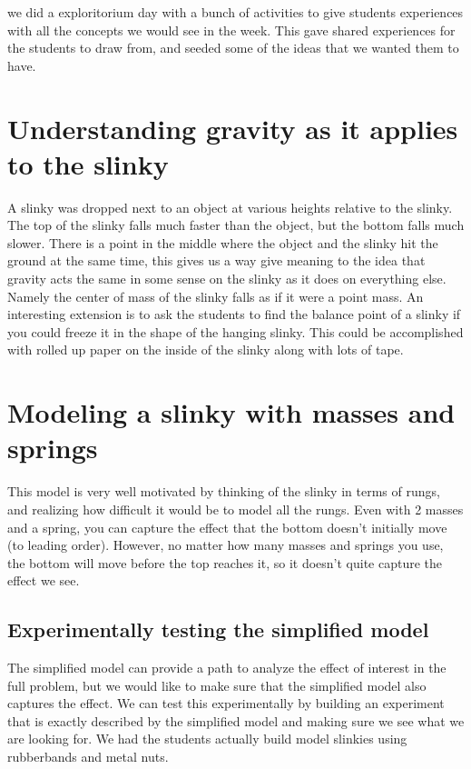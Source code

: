 \documentclass[aps,pre,10pt,superscriptaddress,showpacs,amsmath,amssymb,nofootinbib]{revtex4-1}
\begin{document}
we did a exploritorium day with a bunch of activities to give students experiences with all the concepts we would see in the week.  This gave shared experiences for the students to draw from, and seeded some of the ideas that we wanted them to have.

\section{Understanding gravity as it applies to the slinky}
A slinky was dropped next to an object at various heights relative to the slinky.  The top of the slinky falls much faster than the object, but the bottom falls much slower.  There is a point in the middle where the object and the slinky hit the ground at the same time, this gives us a way give meaning to the idea that gravity acts the same in some sense on the slinky as it does on everything else. Namely the center of mass of the slinky falls as if it were a point mass. An interesting extension is to ask the students to find the balance point of a slinky if you could freeze it in the shape of the hanging slinky.  This could be accomplished with rolled up paper on the inside of the slinky along with lots of tape.



\section{Modeling a slinky with masses and springs}

This model is very well motivated by thinking of the slinky in terms of rungs, and realizing how difficult it would be to model all the rungs.  Even with 2 masses and a spring, you can capture the effect that the bottom doesn't initially move (to leading order).  However, no matter how many masses and springs you use, the bottom will move before the top reaches it, so it doesn't quite capture the effect we see. 

\subsection{Experimentally testing the simplified model}
The simplified model can provide a path to analyze the effect of interest in the full problem, but we would like to make sure that the simplified model also captures the effect.  We can test this experimentally by building an experiment that is exactly described by the simplified model and making sure we see what we are looking for.  We had the students actually build model slinkies using rubberbands and metal nuts.  
\end{document}
